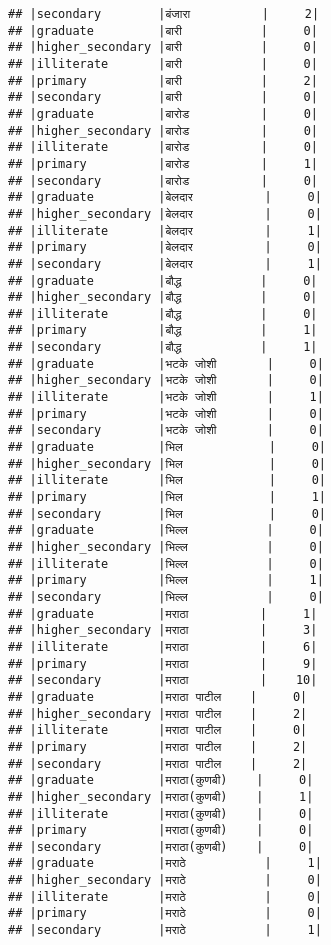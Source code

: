 \documentclass[
]{article}
\begin{document}
\begin{verbatim}
## |secondary        |बंजारा          |     2|
## |graduate         |बारी           |     0|
## |higher_secondary |बारी           |     0|
## |illiterate       |बारी           |     0|
## |primary          |बारी           |     2|
## |secondary        |बारी           |     0|
## |graduate         |बारोड          |     0|
## |higher_secondary |बारोड          |     0|
## |illiterate       |बारोड          |     0|
## |primary          |बारोड          |     1|
## |secondary        |बारोड          |     0|
## |graduate         |बेलदार          |     0|
## |higher_secondary |बेलदार          |     0|
## |illiterate       |बेलदार          |     1|
## |primary          |बेलदार          |     0|
## |secondary        |बेलदार          |     1|
## |graduate         |बौद्ध           |     0|
## |higher_secondary |बौद्ध           |     0|
## |illiterate       |बौद्ध           |     0|
## |primary          |बौद्ध           |     1|
## |secondary        |बौद्ध           |     1|
## |graduate         |भटके जोशी       |     0|
## |higher_secondary |भटके जोशी       |     0|
## |illiterate       |भटके जोशी       |     1|
## |primary          |भटके जोशी       |     0|
## |secondary        |भटके जोशी       |     0|
## |graduate         |भिल            |     0|
## |higher_secondary |भिल            |     0|
## |illiterate       |भिल            |     0|
## |primary          |भिल            |     1|
## |secondary        |भिल            |     0|
## |graduate         |भिल्ल           |     0|
## |higher_secondary |भिल्ल           |     0|
## |illiterate       |भिल्ल           |     0|
## |primary          |भिल्ल           |     1|
## |secondary        |भिल्ल           |     0|
## |graduate         |मराठा          |     1|
## |higher_secondary |मराठा          |     3|
## |illiterate       |मराठा          |     6|
## |primary          |मराठा          |     9|
## |secondary        |मराठा          |    10|
## |graduate         |मराठा पाटील    |     0|
## |higher_secondary |मराठा पाटील    |     2|
## |illiterate       |मराठा पाटील    |     0|
## |primary          |मराठा पाटील    |     2|
## |secondary        |मराठा पाटील    |     2|
## |graduate         |मराठा(कुणबी)    |     0|
## |higher_secondary |मराठा(कुणबी)    |     1|
## |illiterate       |मराठा(कुणबी)    |     0|
## |primary          |मराठा(कुणबी)    |     0|
## |secondary        |मराठा(कुणबी)    |     0|
## |graduate         |मराठे           |     1|
## |higher_secondary |मराठे           |     0|
## |illiterate       |मराठे           |     0|
## |primary          |मराठे           |     0|
## |secondary        |मराठे           |     1|

\end{verbatim}
\end{document}
